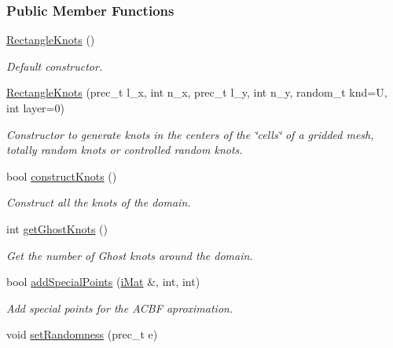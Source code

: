 \subsubsection*{Public Member Functions}
\begin{CompactItemize}
\item 
\hypertarget{classRectangleKnots_300b9977a35292fcfad3cab645c05b68}{
\hyperlink{classRectangleKnots_300b9977a35292fcfad3cab645c05b68}{RectangleKnots} ()}
\label{classRectangleKnots_300b9977a35292fcfad3cab645c05b68}

\begin{CompactList}\small\item\em Default constructor. \item\end{CompactList}\item 
\hyperlink{classRectangleKnots_ed0a328ffda0938f35aa7b1b5fc8952e}{RectangleKnots} (prec\_\-t l\_\-x, int n\_\-x, prec\_\-t l\_\-y, int n\_\-y, random\_\-t knd=U, int layer=0)
\begin{CompactList}\small\item\em Constructor to generate knots in the centers of the \char`\"{}cells\char`\"{} of a gridded mesh, totally random knots or controlled random knots. \item\end{CompactList}\item 
bool \hyperlink{classRectangleKnots_b9906bc5081f67e7f0ce6da2123028bf}{constructKnots} ()
\begin{CompactList}\small\item\em Construct all the knots of the domain. \item\end{CompactList}\item 
\hypertarget{classRectangleKnots_94590fd5dbc3cdac1d53fbb00dd8f0b2}{
int \hyperlink{classRectangleKnots_94590fd5dbc3cdac1d53fbb00dd8f0b2}{getGhostKnots} ()}
\label{classRectangleKnots_94590fd5dbc3cdac1d53fbb00dd8f0b2}

\begin{CompactList}\small\item\em Get the number of Ghost knots around the domain. \item\end{CompactList}\item 
bool \hyperlink{classRectangleKnots_79604c78432ea23cfb28fc09d612f48c}{addSpecialPoints} (\hyperlink{Traits_8hpp_a667f32088e1c93b532a640fe84dc4cd}{iMat} \&, int, int)
\begin{CompactList}\small\item\em Add special points for the ACBF aproximation. \item\end{CompactList}\item 
\hypertarget{classRectangleKnots_61d033edb27922e4df40ed58da671aca}{
void \hyperlink{classRectangleKnots_61d033edb27922e4df40ed58da671aca}{setRandomness} (prec\_\-t e)}
\label{classRectangleKnots_61d033edb27922e4df40ed58da671aca}


\end{CompactItemize}

